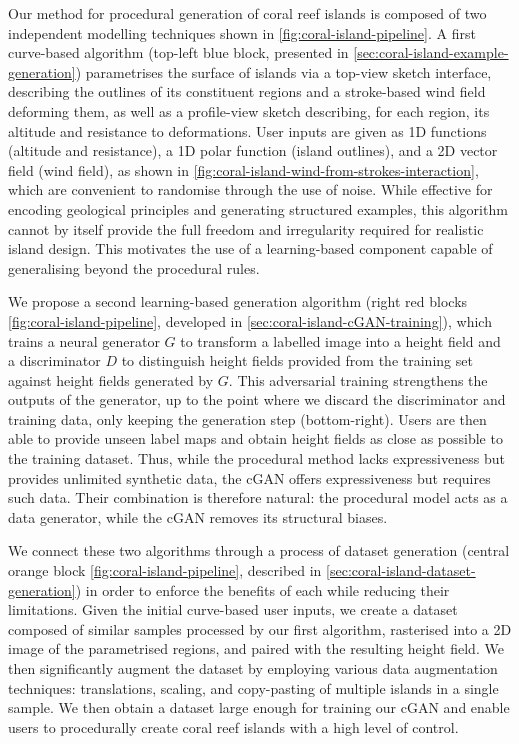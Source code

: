 Our method for procedural generation of coral reef islands is composed of two independent modelling techniques shown in \cref{fig:coral-island-pipeline}. A first curve-based algorithm (top-left blue block, presented in \cref{sec:coral-island-example-generation}) parametrises the surface of islands via a top-view sketch interface, describing the outlines of its constituent regions and a stroke-based wind field deforming them, as well as a profile-view sketch describing, for each region, its altitude and resistance to deformations. User inputs are given as 1D functions (altitude and resistance), a 1D polar function (island outlines), and a 2D vector field (wind field), as shown in \cref{fig:coral-island-wind-from-strokes-interaction}, which are convenient to randomise through the use of noise. While effective for encoding geological principles and generating structured examples, this algorithm cannot by itself provide the full freedom and irregularity required for realistic island design. This motivates the use of a learning-based component capable of generalising beyond the procedural rules.

We propose a second learning-based generation algorithm (right red blocks \cref{fig:coral-island-pipeline}, developed in \cref{sec:coral-island-cGAN-training}), which trains a neural generator $G$ to transform a labelled image into a height field and a discriminator $D$ to distinguish height fields provided from the training set against height fields generated by $G$. This adversarial training strengthens the outputs of the generator, up to the point where we discard the discriminator and training data, only keeping the generation step (bottom-right). Users are then able to provide unseen label maps and obtain height fields as close as possible to the training dataset. Thus, while the procedural method lacks expressiveness but provides unlimited synthetic data, the cGAN offers expressiveness but requires such data. Their combination is therefore natural: the procedural model acts as a data generator, while the cGAN removes its structural biases.

We connect these two algorithms through a process of dataset generation (central orange block \cref{fig:coral-island-pipeline}, described in \cref{sec:coral-island-dataset-generation}) in order to enforce the benefits of each while reducing their limitations. Given the initial curve-based user inputs, we create a dataset composed of similar samples processed by our first algorithm, rasterised into a 2D image of the parametrised regions, and paired with the resulting height field. We then significantly augment the dataset by employing various data augmentation techniques: translations, scaling, and copy-pasting of multiple islands in a single sample. We then obtain a dataset large enough for training our cGAN and enable users to procedurally create coral reef islands with a high level of control.

